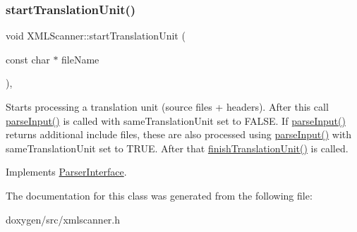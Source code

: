 \mbox{\label{class_x_m_l_scanner_a105515420268054f9ff54bd60793cfbb}} 
\subsubsection{\texorpdfstring{startTranslationUnit()}{startTranslationUnit()}}
{\footnotesize\ttfamily void X\+M\+L\+Scanner\+::start\+Translation\+Unit (\begin{DoxyParamCaption}\item[{const char $\ast$}]{file\+Name }\end{DoxyParamCaption})\hspace{0.3cm}{\ttfamily [inline]}, {\ttfamily [virtual]}}

Starts processing a translation unit (source files + headers). After this call \mbox{\hyperlink{class_x_m_l_scanner_ad7b6e344f24e73a8757937a806b5931a}{parse\+Input()}} is called with same\+Translation\+Unit set to F\+A\+L\+SE. If \mbox{\hyperlink{class_x_m_l_scanner_ad7b6e344f24e73a8757937a806b5931a}{parse\+Input()}} returns additional include files, these are also processed using \mbox{\hyperlink{class_x_m_l_scanner_ad7b6e344f24e73a8757937a806b5931a}{parse\+Input()}} with same\+Translation\+Unit set to T\+R\+UE. After that \mbox{\hyperlink{class_x_m_l_scanner_a00b3082e888d6bd670fdc31e52b79606}{finish\+Translation\+Unit()}} is called. 

Implements \mbox{\hyperlink{class_parser_interface_a72478f87ead5fde10d7d6bbe32a73024}{Parser\+Interface}}.



The documentation for this class was generated from the following file\+:\begin{DoxyCompactItemize}
\item 
doxygen/src/xmlscanner.\+h\end{DoxyCompactItemize}
